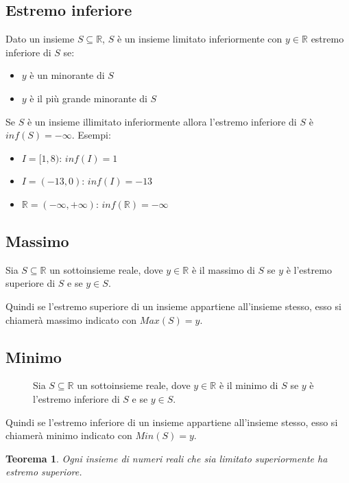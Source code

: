 \documentclass[a4paper]{article}
\newtheorem{theorem}{Teorema}
\theoremstyle{break}
\theoremstyle{break}
\theoremstyle{break}
\theoremstyle{break}
\begin{document}
\subsection{Estremo inferiore}
Dato un insieme \( S \subseteq \mathbb{R} \), \( S \) è un insieme limitato inferiormente con \( y \in \mathbb{R} \)
estremo inferiore di \( S \) se:
\begin{itemize}
	\item \( y \) è un minorante di \( S \)
	\item \( y \) è il più grande minorante di \( S \)
\end{itemize}
Se \( S \) è un insieme illimitato inferiormente allora l'estremo inferiore di \( S \) è \( inf(S)=-\infty \).
Esempi:
\begin{itemize}
	\item \( I=[1,8) \): \( inf(I) = 1 \)
	\item \( I=(-13,0) \): \( inf(I) = -13 \)
	\item \( \mathbb{R} = (-\infty, +\infty) \): \( inf(\mathbb{R}) = -\infty \)
\end{itemize}


\subsection{Massimo}
\begin{definition}
	Sia \( S \subseteq \mathbb{R} \) un sottoinsieme reale, dove \( y \in \mathbb{R} \) è il massimo
	di \( S \) se \( y \) è l'estremo superiore di \( S \) e se \( y \in S \).
\end{definition}
Quindi se l'estremo superiore di un insieme appartiene all'insieme stesso, esso si chiamerà
massimo indicato con \( Max(S)=y \).


\subsection{Minimo}
\begin{figure}[H]
	\begin{definition}
		Sia \( S \subseteq \mathbb{R} \) un sottoinsieme reale, dove \( y \in \mathbb{R} \) è il minimo
		di \( S \) se \( y \) è l'estremo inferiore di \( S \) e se \( y \in S \).
	\end{definition}
\end{figure}
Quindi se l'estremo inferiore di un insieme appartiene all'insieme stesso, esso si chiamerà
minimo indicato con \( Min(S)=y \).

\begin{theorem}
	Ogni insieme di numeri reali che sia limitato superiormente ha estremo superiore.
\end{theorem}
\end{document}
